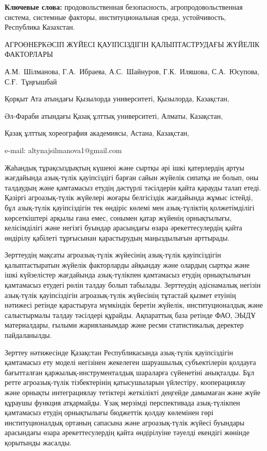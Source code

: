 {\bfseries Ключевые слова:} продовольственная безопасность,
агропродовольственная система, системные факторы, институциональная
среда, устойчивость, Республика Казахстан.

\begin{header}
АГРОӨНЕРКӘСІП ЖҮЙЕСІ ҚАУІПСІЗДІГІН ҚАЛЫПТАСТРУДАҒЫ ЖҮЙЕЛІК ФАКТОРЛАРЫ

А.М.~Шілманова\envelope,
Г.А.~Ибраева,
А.С.~Шайнуров,
Г.К.~Иляшова,
С.А.~Юсупова,
С.Ғ.~Тұңғышбай
\end{header}

\begin{affil}
Қорқыт Ата атындағы Қызылорда университеті, Қызылорда, Казақстан,

Әл-Фараби атындағы Қазақ ұлттық университеті, Алматы, Казақстан,

Қазақ ұлттық хореография академиясы, Астана, Казақстан,

e-mail: altynajsilmanova1@gmail.com
\end{affil}

Жаһандық тұрақсыздықтың күшеюі және сыртқы әрі ішкі қатерлердің артуы
жағдайында азық-түлік қауіпсіздігі барған сайын жүйелік сипатқа ие
болып, оны талдаудың және қамтамасыз етудің дәстүрлі тәсілдерін қайта
қарауды талап етеді. Қазіргі агроазық-түлік жүйелері жоғары белгісіздік
жағдайында жұмыс істейді, бұл азық-түлік қауіпсіздігін тек өндіріс
көлемі мен азық-түліктің қолжетімділігі көрсеткіштері арқылы ғана емес,
сонымен қатар жүйенің орнықтылығы, келісімділігі және негізгі буындар
арасындағы өзара әрекеттесулердің қайта өндірілу қабілеті тұрғысынан
қарастырудың маңыздылығын арттырады.

Зерттеудің мақсаты агроазық-түлік жүйесінің азық-түлік қауіпсіздігін
қалыптастыратын жүйелік факторларды айқындау және олардың сыртқы және
ішкі күйзелістер жағдайында азық-түлікпен қамтамасыз етудің орнықтылығын
қамтамасыз етудегі рөлін талдау болып табылады. Зерттеудің әдіснамалық
негізін азық-түлік қауіпсіздігін агроазық-түлік жүйесінің тұтастай
қызмет етуінің нәтижесі ретінде қарастыруға мүмкіндік беретін жүйелік,
институционалдық және салыстырмалы талдау тәсілдері құрайды. Ақпараттық
база ретінде ФАО, ЭЫДҰ материалдары, ғылыми жарияланымдар және ресми
статистикалық деректер пайдаланылды.

Зерттеу нәтижесінде Қазақстан Республикасында азық-түлік қауіпсіздігін
қамтамасыз ету моделі негізінен жекелеген шаруашылық субъектілерін
қолдауға бағытталған қаржылық-инструмент\-алдық шараларға сүйенетіні
анықталды. Бұл ретте агроазық-түлік тізбектерінің қатысушыларын
үйлестіру, кооперациялау және орнықты интеграциялау тетіктері жеткілікті
деңгейде дамымаған және жүйе құраушы функция атқармайды. Ұзақ мерзімді
перспективада азық-түлікпен қамтамасыз етудің орнықтылығы бюджеттік
қолдау көлемінен гөрі институционалдық ортаның сапасына және
агроазық-түлік жүйесі буындары арасындағы өзара әрекеттесулердің қайта
өндірілуіне тәуелді екендігі жөнінде қорытынды жасалды.

